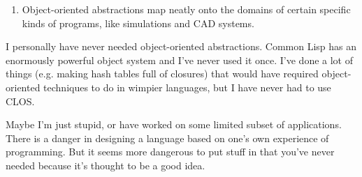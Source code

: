 \begin{enumerate}
                    
\item 
                      Object-oriented abstractions map neatly onto the domains
                      of certain specific kinds of programs, like simulations
                      and CAD systems.
                    
\end{enumerate}

                  
                    I personally have never needed object-oriented abstractions.
                    Common Lisp has an enormously powerful object system and
                    I've never used it once. I've done a lot of things (e.g.
                    making hash tables full of closures) that would have
                    required object-oriented techniques to do in wimpier
                    languages, but I have never had to use CLOS.

Maybe
                    I'm just stupid, or have worked on some limited subset of
                    applications. There is a danger in designing a language
                    based on one's own experience of programming. But it seems
                    more dangerous to put stuff in that you've never needed
                    because it's thought to be a good idea.



              
            
          
